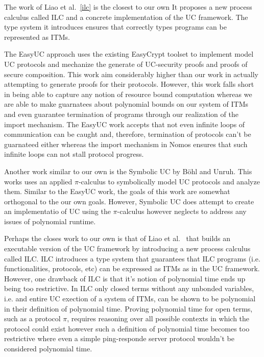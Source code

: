 The work of Liao et al.~\ref{ilc} is the closest to our own
It proposes a new process calculus called ILC and a concrete implementation of the UC framework.
The type system it introduces ensures that correctly types programs can be represented as ITMs.


The EasyUC approach uses the existing EasyCrypt toolset to implement model UC protocols and mechanize the generate of UC-security proofs and proofs of secure composition.
This work aim considerably higher than our work in actually attempting to generate proofs for their protocols. 
However, this work falls short in being able to capture any notion of resource bound computation whereas we are able to make guarnatees about polynomial bounds on our system of ITMs and even guarantee termination of programs through our realization of the import mechanism.
The EasyUC work accepts that not even infinite loops of communication can be caught and, therefore, termination of protocols can't be guarnateed either whereas the import mechanism in Nomos ensures that such infinite loops can not stall protocol progress.

Another work similar to our own is the Symbolic UC by B\"{o}hl and Unruh.
This works uses an applied $\pi$-calculus to symbolically model UC protocols and analyze them.
Similar to the EasyUC work, the goals of this work are somewhat orthogonal to the our own goals.
However, Symbolic UC does attempt to create an implementatio of UC using the $\pi$-calculus however neglects to address any issues of polynomial runtime.

Perhaps the closes work to our own is that of Liao et al.~\cite{ilc} that builds an executable version of the UC framework by introducing a new process calculus called ILC.
ILC introduces a type system that guarantees that ILC programs (i.e. functionalities, protocols, etc) can be expressed as ITMs as in the UC framework.
However, one drawback of ILC is that it's notion of polynomial time ends up being too restrictive.
In ILC only closed terms without any unbonded variables, i.e. and entire UC exection of a system of ITMs, can be shown to be polynomial in their definition of polynomial time.
Proving polynomial time for open terms, such as a protocol $\pi$, requires reasoning over all possible contexts in which the protocol could exist however such a definition of polynomial time becomes too restrictive where even a simple ping-responde server protocol wouldn't be considered polynomial time.
